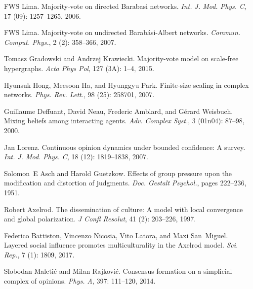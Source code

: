 FWS Lima.
\newblock Majority-vote on directed {{Barabasi}} networks.
\newblock \emph{Int. J. Mod. Phys. C}, 17 (09): 1257--1265,
2006.

FWS Lima.
\newblock Majority-vote on undirected {{Barab{\'a}si}}-{{Albert}} networks.
\newblock \emph{Commun. Comput. Phys.}, 2 (2): 358--366,
2007.

Tomasz Gradowski and Andrzej Krawiecki.
\newblock Majority-vote model on scale-free hypergraphs.
\newblock \emph{Acta Phys Pol}, 127 (3A): 1--4, 2015.

Hyunsuk Hong, Meesoon Ha, and Hyunggyu Park.
\newblock Finite-size scaling in complex networks.
\newblock \emph{Phys. Rev. Lett.}, 98 (25): 258701, 2007.

Guillaume Deffuant, David Neau, Frederic Amblard, and G{\'e}rard Weisbuch.
\newblock Mixing beliefs among interacting agents.
\newblock \emph{Adv. Complex Syst.}, 3 (01n04): 87--98, 2000.

Jan Lorenz.
\newblock Continuous opinion dynamics under bounded confidence: {{A}} survey.
\newblock \emph{Int. J. Mod. Phys. C}, 18 (12): 1819--1838,
2007.

Solomon~E Asch and Harold Guetzkow.
\newblock Effects of group pressure upon the modification and distortion of
judgments.
\newblock \emph{Doc. Gestalt Psychol.}, pages 222--236, 1951.

Robert Axelrod.
\newblock The dissemination of culture: {{A}} model with local convergence and
global polarization.
\newblock \emph{J Confl Resolut}, 41 (2): 203--226, 1997.

Federico Battiston, Vincenzo Nicosia, Vito Latora, and Maxi San~Miguel.
\newblock Layered social influence promotes multiculturality in the {{Axelrod}}
model.
\newblock \emph{Sci. Rep.}, 7 (1): 1809, 2017{}.

Slobodan Maleti{\'c} and Milan Rajkovi{\'c}.
\newblock Consensus formation on a simplicial complex of opinions.
\newblock \emph{Phys. A}, 397: 111--120, 2014.


